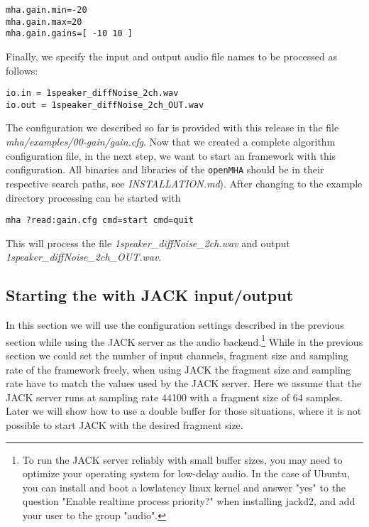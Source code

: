 \begin{verbatim}
mha.gain.min=-20
mha.gain.max=20
mha.gain.gains=[ -10 10 ]
\end{verbatim}

%
Finally, we specify the input and output audio file names to be processed as 
follows:
\begin{verbatim}
io.in = 1speaker_diffNoise_2ch.wav
io.out = 1speaker_diffNoise_2ch_OUT.wav
\end{verbatim}
The configuration we described so far is provided with this release 
in the file \emph{mha/examples/00-gain/gain.cfg}.
Now that we created a complete \mha{} algorithm configuration file,
in the next step, we want to start an \mha{} framework with this configuration.
%
All binaries and libraries of the \verb!openMHA! should be in their respective
search paths, see \emph{INSTALLATION.md}). After changing to the example
directory \mha{} processing can be started with
\begin{verbatim}
mha ?read:gain.cfg cmd=start cmd=quit
\end{verbatim}
%
This will process the file \emph{1speaker\_diffNoise\_2ch.wav} and output 
\emph{1speaker\_diffNoise\_2ch\_OUT.wav}.

\subsection{Starting the \mhad{} with JACK input/output}%
\label{sec:example_jack}%
%
%
%

In this section we will use the configuration settings described in
the previous section while using the JACK server as the audio
backend.\footnote{To run the JACK server reliably with small buffer
  sizes, you may need to optimize your operating system for low-delay
  audio. In the case of Ubuntu, you can install and boot a lowlatency
  linux kernel and answer "yes" to the question "Enable realtime process
  priority?" when installing jackd2, and add your user to the group
  "audio".
}
%
While in the previous section
we could  set the number of 
input channels, fragment size and sampling rate of the framework freely,
when using JACK the fragment size
and sampling rate have to match the values used by the JACK server.
%
Here we assume that the JACK server runs at sampling rate 44100 with a
fragment size of 64 samples.
%
Later we will show how to use a double buffer for those
situations, where it is not possible to start JACK with the desired
fragment size. 

